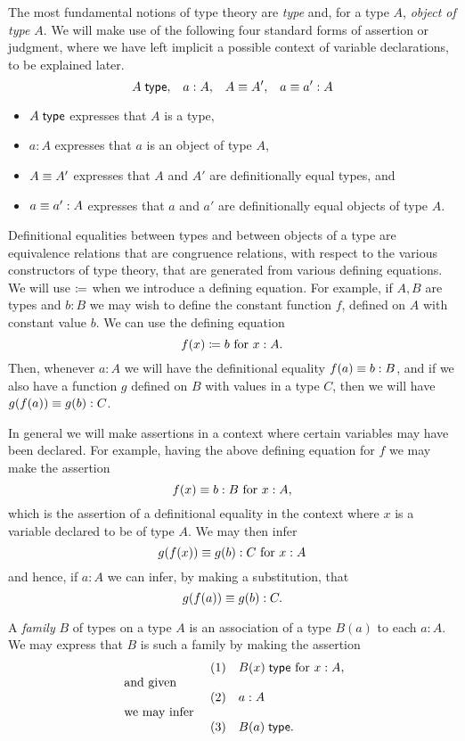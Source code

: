 {The most fundamental notions of type theory are {\em type} and, for a type $A$, {\em object of type $A$}.  We will make use of the following four standard forms of assertion or judgment, where we have left implicit 
a possible context of variable declarations, to be explained later.
  \[ A{\;\sf type},\;\;\; a:A,\;\;\; A\equiv A',\;\;\; a\equiv a':A\]
\begin{itemize}
\item $A{\;\sf type}$ expresses that $A$ is a type, 
\item $a:A$ expresses that $a$ is an object of type $A$, 
\item $A\equiv A'$ expresses that $A$ and $A'$ are definitionally equal types, and
\item $a\equiv a':A$ expresses that $a$ and $a'$ are definitionally equal objects of type $A$.
\end{itemize}
Definitional equalities between types and between objects of a type are equivalence relations that are congruence relations, with respect to the various constructors of type theory, that are generated from various defining equations.  We will use $\coloneqq$ when we introduce a defining equation.
For example, if $A,B$ are types and $b:B$ we may wish to define the constant function $f$, defined on $A$ with constant value $b$.  We can use the defining equation
  \[ f(x)\coloneqq b\mbox{ for } x:A.\]
Then, whenever $a:A$ we will have the definitional equality $f(a)\equiv b:B$, and if we also have a function $g$ defined on $B$ with values in a type $C$, then we will have $g(f(a))\equiv g(b):C$.  

In general we will make assertions in a context where certain variables may have been declared.  For example, having the above defining equation for $f$ we may make the assertion
  \[ f(x)\equiv b:B\mbox{ for } x:A,\]
which is the assertion of a definitional equality in the context where $x$ is a variable declared to be of type $A$.  We may then infer
  \[ g(f(x))\equiv g(b):C\mbox{ for } x:A\]
and hence, if $a:A$ we can infer, by making  a substitution, that
  \[ g(f(a))\equiv g(b):C.\]

A {\em family} $B$ of types on a type $A$ is an association of a type $B(a)$ to each $a:A$.  We may express that $B$ is such a family by making the assertion
  \[\begin{array}{lll}
   & (1) &  B(x){\;\sf type}\mbox{ for } x:A,\\
\mbox{ and given } &&\\
& (2) & a:A\\
\mbox{ we may infer } &&\\
& (3)  & B(a){\;\sf type} .
  \end{array}\]

}

